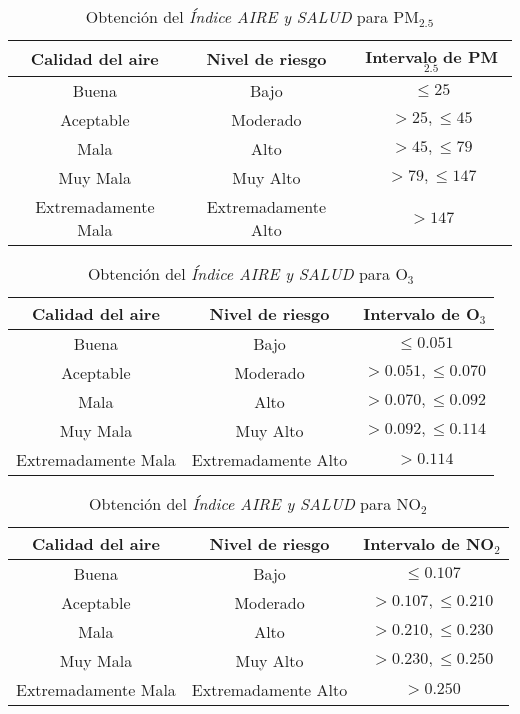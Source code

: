\begin{table}[H]
\centering
\caption{Obtención del {\em Índice AIRE y SALUD} para PM$_{2.5}$}
\begin{adjustbox}{max width=0.9\textwidth}
\begin{tabular}{|c|c|c|}
\hline
Calidad del aire & Nivel de riesgo & Intervalo de PM$_{2.5}$ \\ \hline
Buena &Bajo &$\leq25$ \\
Aceptable &Moderado &$>25, \leq45$  \\
Mala &Alto &$>45, \leq79$ \\
Muy Mala &Muy Alto &$>79, \leq147$ \\
Extremadamente Mala &Extremadamente Alto &$>147$ \\ \hline
\end{tabular}
\end{adjustbox}
\label{basepm25}
\end{table}

\begin{table}[H]
\centering
\caption{Obtención del {\em Índice AIRE y SALUD} para O$_{3}$}
\begin{adjustbox}{max width=0.9\textwidth}
\begin{tabular}{|c|c|c|}
\hline
Calidad del aire & Nivel de riesgo & Intervalo de O$_{3}$ \\ \hline
Buena &Bajo &$\leq0.051$ \\
Aceptable &Moderado &$>0.051, \leq0.070$ \\
Mala &Alto &$>0.070, \leq0.092$ \\
Muy Mala &Muy Alto &$>0.092, \leq0.114$ \\
Extremadamente Mala &Extremadamente Alto &$>0.114$ \\ \hline
\end{tabular}
\end{adjustbox}
\label{baseo3}
\end{table}

\begin{table}[H]
\centering
\caption{Obtención del {\em Índice AIRE y SALUD} para NO$_{2}$}
\begin{adjustbox}{max width=0.9\textwidth}
\begin{tabular}{|c|c|c|}
\hline
Calidad del aire & Nivel de riesgo & Intervalo de NO$_{2}$ \\ \hline
Buena &Bajo &$\leq0.107$ \\
Aceptable &Moderado &$>0.107, \leq0.210$  \\
Mala &Alto &$>0.210, \leq0.230$ \\
Muy Mala &Muy Alto &$>0.230, \leq0.250$ \\
Extremadamente Mala &Extremadamente Alto &$>0.250$ \\ \hline
\end{tabular}
\end{adjustbox}
\label{baseno2}
\end{table}

